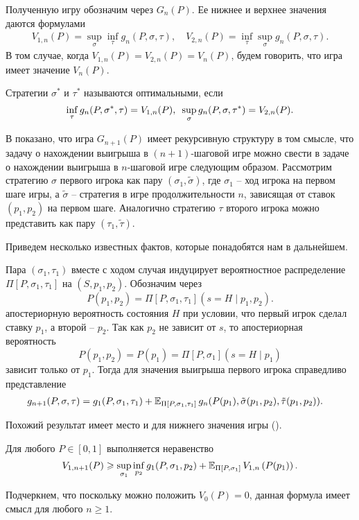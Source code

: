{Полученную игру обозначим через $G_n(P)$. Ее нижнее и верхнее значения даются формулами
\begin{align*}
  V_{1,n}(P) = \sup_\sigma \inf_\tau g_n(P, \sigma, \tau), \quad
  V_{2,n}(P) = \inf_\tau \sup_\sigma g_n(P, \sigma, \tau).
\end{align*}
В том случае, когда $V_{1,n}(P) = V_{2,n}(P) = V_n(P)$, будем говорить, что игра имеет значение $V_n(P)$.

Стратегии $\sigma^*$ и $\tau^*$ называются оптимальными, если
\[
  \inf_\tau g_n(P, \sigma^*, \tau) = V_{1,n}(P), \enskip \sup_\sigma g_n(P,
  \sigma, \tau^*) = V_{2,n}(P).
\]

В \cite{demeyer02} показано, что игра $G_{n+1}(P)$ имеет рекурсивную структуру в том смысле, что задачу о нахождении выигрыша в $(n+1)$-шаговой игре можно свести в задаче о нахождении выигрыша в $n$-шаговой игре следующим образом.
Рассмотрим стратегию $\sigma$ первого игрока как пару $(\sigma_1, \tilde{\sigma})$, где $\sigma_1$ -- ход игрока на первом шаге игры, а $\tilde{\sigma}$ -- стратегия в игре продолжительности $n$, зависящая от ставок $(p_1, p_2)$ на первом шаге. 
Аналогично стратегию $\tau$ второго игрока можно представить как пару $(\tau_1, \tilde{\tau})$.

Приведем несколько известных фактов, которые понадобятся нам в дальнейшем.

Пара $(\sigma_1, \tau_1)$ вместе с ходом случая индуцирует вероятностное распределение $\Pi[P, \sigma_1, \tau_1]$ на $(S, p_1, p_2)$.
Обозначим через
\[
  P(p_1, p_2) = \Pi[P, \sigma_1, \tau_1](s = H \;|\; p_1, p_2).
\]
апостериорную вероятность состояния $H$ при условии, что первый игрок сделал ставку $p_1$, а второй -- $p_2$.
Так как $p_2$ не зависит от $s$, то апостериорная вероятность
\[
  P(p_1,p_2) = P(p_1) = \Pi[P, \sigma_1](s = H \; | \; p_1)
\]
зависит только от $p_1$.
Тогда для значения выигрыша первого игрока справедливо представление
\begin{align*}
  g_{n+1}(P, \sigma, \tau) 
  &= 
    g_1(P, \sigma_1, \tau_1) +
    \operatorname{\mathbb{E}}_{\Pi[P, \sigma_1, \tau_1]}
    g_n(P(p_1), \tilde{\sigma}(p_1, p_2), \tilde{\tau}(p_1, p_2)).
\end{align*}

Похожий результат имеет место и для нижнего значения игры (\seename \cite{demeyer02}).
\begin{lemma}
  \label{lemma:lowerBound:general}
  Для любого $P \in [0, 1]$ выполняется неравенство
  \begin{equation}
    \label{eq:fp:lowerB:nonParameterized}
    V_{1,n+1}(P) \geqslant \sup_{\sigma_1} \inf_{p_2} g_1(P, \sigma_1, p_2)
    + \operatorname{\mathbb{E}}_{\Pi[P, \sigma_1]} V_{1,n}\left( P(p_1) \right).
  \end{equation}
\end{lemma}
Подчеркнем, что поскольку можно положить $V_0(P) = 0$, данная формула имеет смысл для любого $n \geqslant 1$.

}
